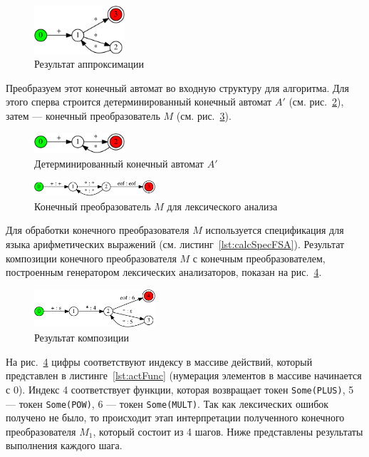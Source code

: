 \documentclass[10pt, conference, compsocconf]{IEEEtran}
\begin{document}
\begin{figure}[h]
\centering
\includegraphics[width=0.3\textwidth]{pics/calc_ex}
\caption{Результат аппроксимации}
\label{fig:calc_ex}
\end{figure}

Преобразуем этот конечный автомат во входную структуру для алгоритма. Для этого сперва строится детерминированный конечный автомат $A'$ (см. рис.~\ref{fig:calc_ex_det}), затем --- конечный преобразователь $M$ (см. рис.~\ref{fig:calc_ex_fst}). 

\begin{figure}[h]
\centering
\includegraphics[width=0.3\textwidth]{pics/calc_ex_det}
\caption{Детерминированный конечный автомат $A'$}
\label{fig:calc_ex_det}
\end{figure}

\begin{figure}[h]
\centering
\includegraphics[width=0.4\textwidth]{pics/calc_ex_fst}
\caption{Конечный преобразователь $M$ для лексического анализа }
\label{fig:calc_ex_fst}
\end{figure}

Для обработки конечного преобразователя $M$ используется спецификация для языка арифметических выражений (см. листинг~\ref{lst:calcSpecFSA}). Результат композиции конечного преобразователя $M$ с конечным преобразователем, построенным генератором лексических анализаторов, показан на рис.~\ref{fig:calc_ex_compose}. 

\begin{figure}[h]
\centering
\includegraphics[width=0.4\textwidth]{pics/calc_ex_compose}
\caption{Результат композиции }
\label{fig:calc_ex_compose}
\end{figure}

На рис.~\ref{fig:calc_ex_compose} цифры соответствуют индексу в массиве действий, который представлен в листинге~\ref{lst:actFunc} (нумерация элементов в массиве начинается с 0). Индекс 4 соответствует функции, которая возвращает токен \verb|Some(PLUS)|, 5 --- токен \verb|Some(POW)|, 6 --- токен \verb|Some(MULT)|. Так как лексических ошибок получено не было, то происходит этап интерпретации полученного конечного преобразователя $M_1$, который состоит из 4 шагов. Ниже представлены результаты выполнения каждого шага.
\end{document}
